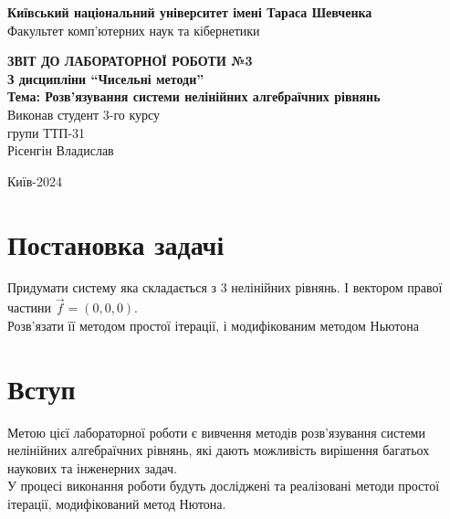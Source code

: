 \documentclass[a4paper, 12pt]{article}
\begin{document}
\begin{titlepage}
	\begin{center}
		\Large
		\textbf{Київський національний університет імені Тараса Шевченка} \\
		Факультет комп'ютерних наук та кібернетики \\

		\vspace{6cm}

		\textbf{\LARGE ЗВІТ ДО ЛАБОРАТОРНОЇ РОБОТИ №3} \\[0.5cm]
		\textbf{З дисципліни ``Чисельні методи''} \\[0.5cm]
		\textbf{Тема: Розв'язування системи нелінійних алгебраїчних рівнянь} \\

		\vfill
		\hspace{7cm} Виконав студент 3-го курсу \\
		\hspace{7cm} групи ТТП-31 \\
		\hspace{7cm} Рісенгін Владислав \\
		\vspace{2cm}

		Київ-2024
	\end{center}
\end{titlepage}

\newpage


\section{Постановка задачі}

Придумати систему яка складається з 3 нелінійних рівнянь. І вектором правої частини $\vec f = (0, 0, 0)$. \\

Розв'язати її методом простої ітерації, і модифікованим методом Ньютона

\section{Вступ}

Метою цієї лабораторної роботи є вивчення методів розв'язування системи нелінійних алгебраїчних рівнянь, 
які дають можливість вирішення багатьох наукових та інженерних задач. \\

У процесі виконання роботи будуть досліджені та реалізовані методи простої ітерації, модифікований метод Нютона.
\end{document}
